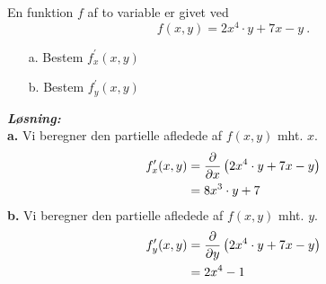 \documentclass{article}
\newcommand{\sol}{\setlength{\parindent}{0cm}\textbf{\textit{Løsning:}}\setlength{\parindent}{1cm}}
\begin{document}
\begin{question}{}{}
 En funktion $f$ af to variable er givet ved
$$f(x,y)=2x^4\cdot y+7x-y\:.$$
\begin{itemize}
  \item[a.] Bestem $f_x^{\prime}(x,y)$
  \item[b.] Bestem $f_y^{\prime}(x,y)$ 
\end{itemize}
\end{question}
\sol \\
\textbf{a.}
Vi beregner den partielle afledede af $f(x,y)$ mht. $x$. 
\begin{equation*}
\begin{split}
  f_x'(x,y)&=\pdv{x} \left(2x^4 \cdot y + 7x-y\right) \\
  &=8x^3 \cdot y + 7
\end{split}
\end{equation*}
\textbf{b.}
Vi beregner den partielle afledede af $f(x,y)$ mht. $y$. 
\begin{equation*}
\begin{split}
  f_y'(x,y)&=\pdv{y} \left(2x^4 \cdot y + 7x - y\right) \\
  &=2x^4-1
\end{split}
\end{equation*}
\end{document}
